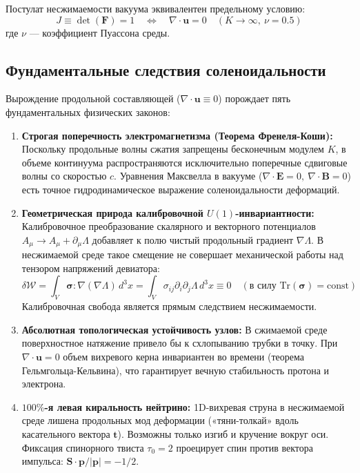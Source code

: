 \documentclass[12pt,a4paper]{article}
\begin{document}
	Постулат несжимаемости вакуума эквивалентен предельному условию:
	\begin{equation}
		J \equiv \det(\mathbf{F}) = 1 \quad \Longleftrightarrow \quad \nabla \cdot \mathbf{u} = 0 \quad (K \to \infty, \ \nu = 0.5)
	\end{equation}
	где $\nu$ — коэффициент Пуассона среды.
	
	\subsection{Фундаментальные следствия соленоидальности}
	Вырождение продольной составляющей ($\nabla \cdot \mathbf{u} \equiv 0$) порождает пять фундаментальных физических законов:
	
	\begin{enumerate}
		\item \textbf{Строгая поперечность электромагнетизма (Теорема Френеля-Коши):} 
		Поскольку продольные волны сжатия запрещены бесконечным модулем $K$, в объеме континуума распространяются исключительно поперечные сдвиговые волны со скоростью $c$. Уравнения Максвелла в вакууме ($\nabla \cdot \mathbf{E} = 0, \ \nabla \cdot \mathbf{B} = 0$) есть точное гидродинамическое выражение соленоидальности деформаций.
		
		\item \textbf{Геометрическая природа калибровочной $U(1)$-инвариантности:} 
		Калибровочное преобразование скалярного и векторного потенциалов $A_\mu \to A_\mu + \partial_\mu \Lambda$ добавляет к полю чистый продольный градиент $\nabla \Lambda$. В несжимаемой среде такое смещение не совершает механической работы над тензором напряжений девиатора:
		\begin{equation}
			\delta \mathcal{W} = \int_V \boldsymbol{\sigma} : \nabla(\nabla \Lambda) \, d^3x = \int_V \sigma_{ij} \partial_i \partial_j \Lambda \, d^3x \equiv 0 \quad (\text{в силу } \mathrm{Tr}(\boldsymbol{\sigma}) = \text{const})
		\end{equation}
		Калибровочная свобода является прямым следствием несжимаемости.
		
		\item \textbf{Абсолютная топологическая устойчивость узлов:}
		В сжимаемой среде поверхностное натяжение привело бы к схлопыванию трубки в точку. При $\nabla \cdot \mathbf{u} = 0$ объем вихревого керна инвариантен во времени (теорема Гельмгольца-Кельвина), что гарантирует вечную стабильность протона и электрона.
		
		\item \textbf{$100\%$-я левая киральность нейтрино:}
		1D-вихревая струна в несжимаемой среде лишена продольных мод деформации («тяни-толкай» вдоль касательного вектора $\mathbf{t}$). Возможны только изгиб и кручение вокруг оси. Фиксация спинорного твиста $\tau_0 = 2$ проецирует спин против вектора импульса: $\mathbf{S} \cdot \mathbf{p}/|\mathbf{p}| = -1/2$.
		

\end{enumerate}
\end{document}

